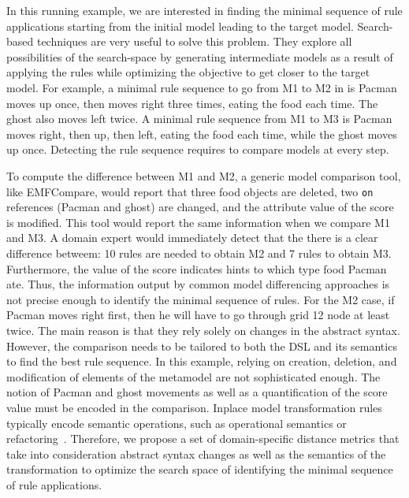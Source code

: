 In this running example, we are interested in finding the minimal sequence of rule applications starting from the initial model leading to the target model.
Search-based techniques are very useful to solve this problem.
They explore all possibilities of the search-space by generating intermediate models as a result of applying the rules while optimizing the objective to get closer to the target model.
For example, a minimal rule sequence to go from M1 to M2 in  is Pacman moves up once, then moves right three times, eating the food each time.
The ghost also moves left twice.
A minimal rule sequence from M1 to M3 is Pacman moves right, then up, then left, eating the food each time, while the ghost moves up once.
Detecting the rule sequence requires to compare models at every step.

To compute the difference between M1 and M2, a generic model comparison tool, like EMFCompare, would report that three food objects are deleted, two \texttt{on} references (Pacman and ghost) are changed, and the attribute value of the score is modified.
This tool would report the same information when we compare M1 and M3.
A domain expert would immediately detect that the there is a clear difference betweem: 10 rules are needed to obtain M2 and 7 rules to obtain M3.
Furthermore, the value of the score indicates hints to which type food Pacman ate.
Thus, the information output by common model differencing approaches is not precise enough to identify the minimal sequence of rules.
For the M2 case, if Pacman moves right first, then he will have to go through grid 12 node at least twice.
The main reason is that they rely solely on changes in the abstract syntax.
However, the comparison needs to be tailored to both the DSL and its semantics to find the best rule sequence.
In this example, relying on creation, deletion, and modification of elements of the metamodel are not sophisticated enough.
The notion of Pacman and ghost movements as well as a quantification of the score value must be encoded in the comparison.
Inplace model transformation rules typically encode semantic operations, such as operational semantics or refactoring~\cite{Lucio2016}.
Therefore, we propose a set of domain-specific distance metrics that take into consideration abstract syntax changes as well as the semantics of the transformation to optimize the search space of identifying the minimal sequence of rule applications.
%
%    
%    

